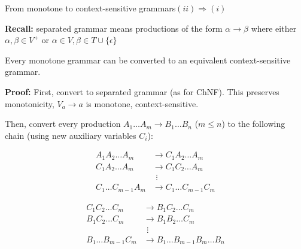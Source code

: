 \documentclass[handout]{beamer}
\begin{document}
\begin{frame}{From monotone to context-sensitive grammars\hfill $(ii)\Rightarrow(i)$}

    \textbf{Recall:} \alert{separated grammar} means productions of the form $\alpha\rightarrow \beta$ where either $\alpha, \beta\in V^+$ or $\alpha \in V,\beta \in T\cup \{\epsilon\}$

    \begin{lemma}
        Every monotone grammar can be converted to an equivalent context-sensitive grammar.
    \end{lemma}
    \vspace{-6pt}
    \textbf{Proof:}
        First, convert to separated grammar (as for ChNF). This preserves monotonicity, $V_a\to a$ is monotone, context-sensitive.

        Then, convert every production $A_1\ldots A_m\rightarrow B_1\ldots B_n $ ($m\leq n$) to the following chain (using new auxiliary variables $C_i$):
        
        \vspace{-0.9cm}

        \begin{multicols}{2}

            \footnotesize
            
            \begin{align*}
                A_1A_2\ldots A_m & \rightarrow C_1A_2\ldots A_m\\
                C_1A_2\ldots A_m & \rightarrow C_1C_2\ldots A_m\\
                &\ \,\vdots\\
                C_1\ldots C_{m-1}A_m & \rightarrow C_1\ldots C_{m-1} C_m
            \end{align*}

            \newcolumn

            \begin{align*}
                C_1C_2\ldots C_m & \rightarrow B_1C_2\ldots C_m\\
                B_1C_2\ldots C_m & \rightarrow B_1B_2\ldots C_m\\
                &\ \,\vdots\\
                B_1\ldots B_{m-1}C_m & \rightarrow B_1\ldots B_{m-1}B_m\ldots B_n\\                
            \end{align*}
                        
        \end{multicols}

\end{frame}
\end{document}
